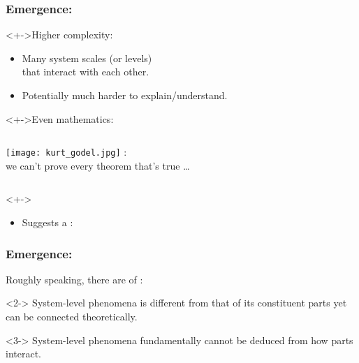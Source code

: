 \begin{frame}
  \frametitle{Emergence:}

  \begin{block}<+->{Higher complexity:}
    \begin{itemize}
    \item 
      Many system scales (or levels) \\ 
      that
      interact with each other.
    \item<+->
      Potentially much harder to explain/understand.
    \end{itemize}
  \end{block}

  \begin{block}<+->{Even mathematics:\cite{foote2007a}}
    \begin{columns}
      \texttt{[image: kurt\_godel.jpg]}
      :\\
      we can't prove every theorem that's true \ldots
    \end{columns}
  \end{block}

  \begin{block}<+->{}
    \begin{itemize}
    \item 
      Suggests a :
    \end{itemize}
  \end{block}

\end{frame}


\begin{frame}
  \frametitle{Emergence:}

  \begin{block}{}
    Roughly speaking, there are  of :  
  \end{block}

  \begin{block}<2->{}
    System-level phenomena is
    different from that of its constituent parts
    yet can be connected theoretically.
  \end{block}

  \begin{block}<3->{}
    System-level 
    phenomena fundamentally cannot
    be deduced from how parts interact.
  \end{block}


\end{frame}

